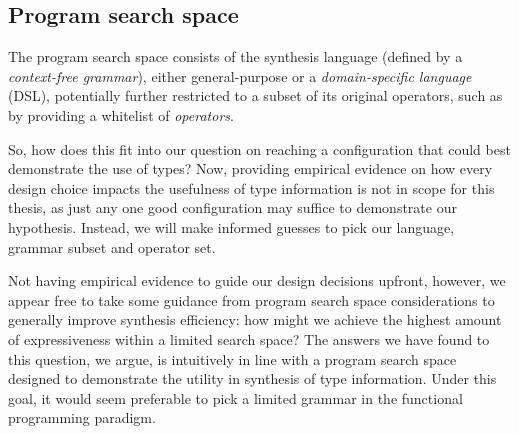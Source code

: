 \documentclass{article} %
\begin{document}
\subsection{Program search space}

The program search space consists of the synthesis language (defined by a \emph{context-free grammar}),
either general-purpose or a \emph{domain-specific language} (DSL),
potentially further restricted to a subset of its original operators,
such as by providing a whitelist of \emph{operators}.


So, how does this fit into our question on reaching a configuration that could best demonstrate the use of types?
Now, providing empirical evidence on how every design choice impacts the usefulness of type information is not in scope for this thesis,
as just any one good configuration may suffice to demonstrate our hypothesis.
Instead, we will make informed guesses
to pick our language, grammar subset and operator set.

Not having empirical evidence to guide our design decisions upfront, however,
we appear free to take some guidance from program search space considerations to generally improve synthesis efficiency:
how might we achieve the highest amount of expressiveness within a limited search space?
The answers we have found to this question, we argue,
is intuitively in line with a program search space designed to demonstrate the utility in synthesis of type information.
Under this goal, it would seem preferable to pick a limited grammar in the functional programming paradigm.

\end{document}
